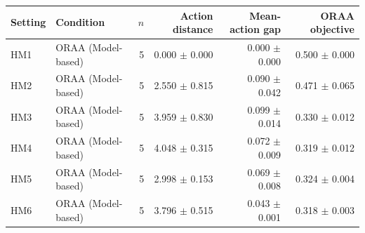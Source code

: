 \begin{tabular}{llrrrr}
\toprule
Setting & Condition & $n$ & Action distance & Mean-action gap & ORAA objective \\
\midrule
HM1 & ORAA (Model-based) & 5 & 0.000 $\pm$ 0.000 & 0.000 $\pm$ 0.000 & 0.500 $\pm$ 0.000 \\
HM2 & ORAA (Model-based) & 5 & 2.550 $\pm$ 0.815 & 0.090 $\pm$ 0.042 & 0.471 $\pm$ 0.065 \\
HM3 & ORAA (Model-based) & 5 & 3.959 $\pm$ 0.830 & 0.099 $\pm$ 0.014 & 0.330 $\pm$ 0.012 \\
HM4 & ORAA (Model-based) & 5 & 4.048 $\pm$ 0.315 & 0.072 $\pm$ 0.009 & 0.319 $\pm$ 0.012 \\
HM5 & ORAA (Model-based) & 5 & 2.998 $\pm$ 0.153 & 0.069 $\pm$ 0.008 & 0.324 $\pm$ 0.004 \\
HM6 & ORAA (Model-based) & 5 & 3.796 $\pm$ 0.515 & 0.043 $\pm$ 0.001 & 0.318 $\pm$ 0.003 \\
\bottomrule
\end{tabular}

